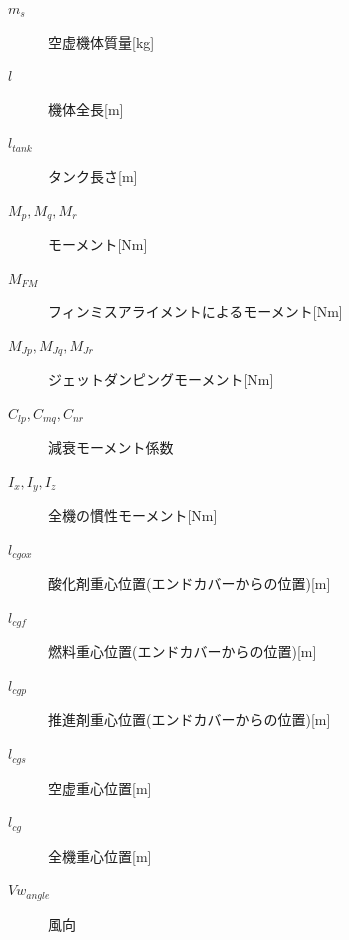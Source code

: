 \documentclass[a4paper]{jarticle}
\begin{document}
\begin{multicols}{2}
\begin{description}
    \item[$m_s$] 空虚機体質量[kg]
    \item[$l$] 機体全長[m]
    \item[$l_{tank}$] タンク長さ[m]
    \item[$M_p,M_q,M_r$] モーメント[Nm]
    \item[$M_{FM}$]フィンミスアライメントによるモーメント[Nm]
    \item[$M_{Jp},M_{Jq},M_{Jr}$] ジェットダンピングモーメント[Nm]
    \item[$C_{lp},C_{mq},C_{nr}$] 減衰モーメント係数
    \item[$I_x,I_y,I_z$] 全機の慣性モーメント[Nm]
    \item[$l_{cgox}$] 酸化剤重心位置(エンドカバーからの位置)[m]
    \item[$l_{cgf}$] 燃料重心位置(エンドカバーからの位置)[m]
    \item[$l_{cgp}$] 推進剤重心位置(エンドカバーからの位置)[m]
    \item[$l_{cgs}$] 空虚重心位置[m]
    \item[$l_{cg}$] 全機重心位置[m]
    \item[$Vw_{angle}$] 風向
  \end{description}
\end{multicols}

\end{document}
